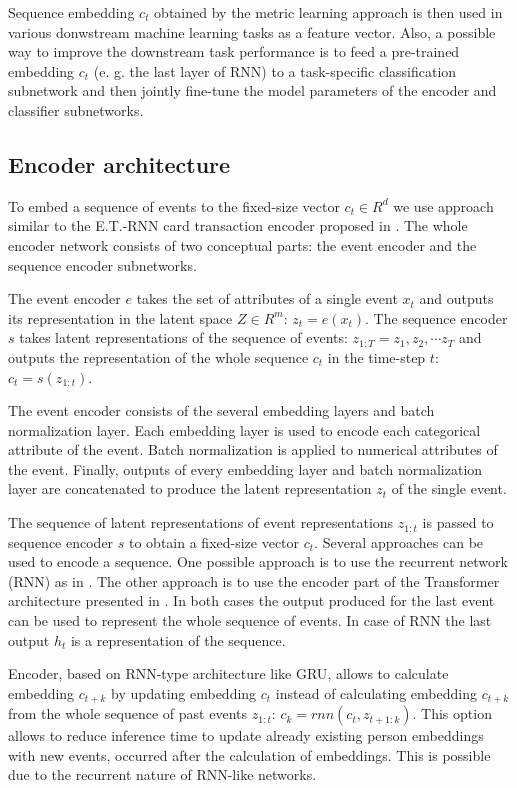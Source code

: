 \documentclass[sigconf, anonymous]{acmart}
\begin{document}
Sequence embedding $c_t$ obtained by the metric learning approach is then used in various donwstream machine learning tasks as a feature vector. Also, a possible way to improve the downstream task performance is to feed a pre-trained embedding $c_t$ (e. g. the last layer of RNN) to a task-specific classification subnetwork and then jointly fine-tune the model parameters of the encoder and classifier subnetworks.

\subsection{Encoder architecture} \label{sec-enc-arch}

To embed a sequence of events to the fixed-size vector $c_t \in R^d$ we use approach similar to the E.T.-RNN card transaction encoder proposed in \cite{10.1145/3292500.3330693}. The whole encoder network consists of two conceptual parts: the event encoder and the sequence encoder subnetworks.

The event encoder $e$ takes the set of attributes of a single event $x_t$ and outputs its representation in the latent space $Z \in R^m$: $z_t = e(x_t)$. The sequence encoder $s$ takes latent representations of the sequence of events: $ z_{1:T} = z_1, z_2, \cdots z_T $ and outputs the representation of the whole sequence $c_t$ in the time-step $t$: $ c_t = s(z_{1:t}) $.

The event encoder consists of the several embedding layers and batch normalization\cite{10.5555/3045118.3045167} layer. Each embedding layer is used to encode each categorical attribute of the event. Batch normalization is applied to numerical attributes of the event. Finally, outputs of every embedding layer and batch normalization layer are concatenated to produce the latent representation $z_t$ of the single event.

The sequence of latent representations of event representations $z_{1:t}$ is passed to sequence encoder $s$ to obtain a fixed-size vector $c_t$. Several approaches can be used to encode a sequence. One possible approach is to use the recurrent network (RNN) as in \cite{Sutskever:2014:SSL:2969033.2969173}. The other approach is to use the encoder part of the Transformer architecture presented in \cite{DBLP:journals/corr/VaswaniSPUJGKP17}. In both cases the output produced for the last event can be used to represent the whole sequence of events. In case of RNN the last output $h_t$ is a representation of the sequence.

Encoder, based on RNN-type architecture like GRU\cite{cho2014learning}, allows to calculate embedding $c_{t+k}$ by updating embedding $c_t$ instead of  calculating embedding $c_{t+k}$ from the whole sequence of past events $z_{1:t}$: $c_k = rnn(c_t, z_{t+1:k})$. This option allows to reduce inference time to update already existing person embeddings with new events, occurred after the calculation of embeddings. This is possible due to the recurrent nature of RNN-like networks.
\end{document}
